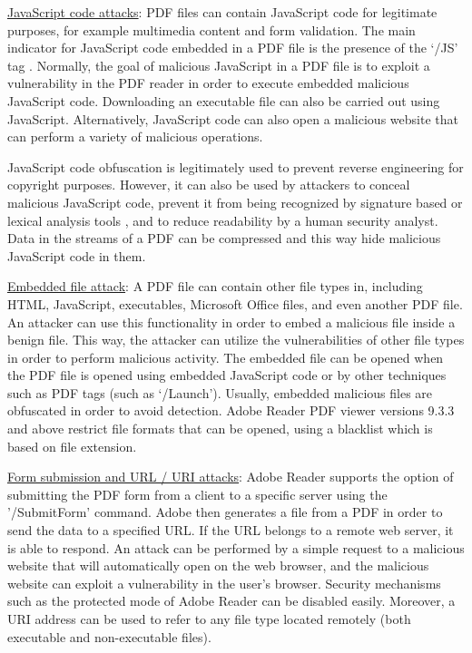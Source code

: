 \documentclass{article}
\begin{document}
\indent \underline{JavaScript code attacks}: PDF files can contain JavaScript code for legitimate purposes, for example multimedia content and form validation. The main indicator for JavaScript code embedded in a PDF file is the presence of the ‘/JS’ tag \cite{1} \cite{JSSrndic2011Laskov} \cite{Bonan2018ML} \cite{JAST2018}. Normally, the goal of malicious JavaScript in a PDF file is to exploit a vulnerability in the PDF reader in order to execute embedded malicious JavaScript code. Downloading an executable file can also be carried out using JavaScript. Alternatively, JavaScript code can also open a malicious website that can perform a variety of malicious operations.

\indent JavaScript code obfuscation is legitimately used to prevent reverse engineering for copyright purposes. However, it can also be used by attackers to conceal malicious JavaScript code, prevent it from being recognized by signature based or lexical analysis tools \cite{JSSrndic2011Laskov}, and to reduce readability by a human security analyst. Data in the streams of a PDF can be compressed and this way hide malicious JavaScript code in them.

\indent \underline{Embedded file attack}: A PDF file can contain other file types in, including HTML, JavaScript, executables, Microsoft Office files, and even another PDF file. An attacker can use this functionality in order to embed a malicious file inside a benign file. This way, the attacker can utilize the vulnerabilities of other file types in order to perform malicious activity. The embedded file can be opened when the PDF file is opened using embedded JavaScript code or by other techniques such as PDF tags (such as ‘/Launch’). Usually, embedded malicious files are obfuscated in order to avoid detection. Adobe Reader PDF viewer versions 9.3.3 and above restrict file formats that can be opened, using a blacklist which is based on file extension.

\indent \underline{Form submission and URL / URI attacks}: Adobe Reader supports the option of submitting the PDF form from a client to a specific server using the '/SubmitForm’ command. Adobe then generates a file from a PDF in order to send the data to a specified URL. If the URL belongs to a remote web server, it is able to respond. An attack can be performed by a simple request to a malicious website that will automatically open on the web browser, and the malicious website can exploit a vulnerability in the user's browser. Security mechanisms such as the protected mode of Adobe Reader can be disabled easily. Moreover, a URI address can be used to refer to any file type located remotely (both executable and non-executable files).
\end{document}
